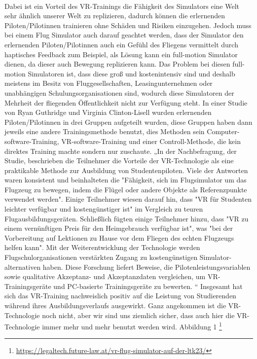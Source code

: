 \\
Dabei ist ein Vorteil des VR-Trainings die Fähigkeit des Simulators eine Welt sehr ähnlich unserer Welt zu replizieren, dadurch können die erlernenden Piloten/Pilotinnen trainieren ohne Schäden und Risiken einzugehen. Jedoch muss bei einem Flug Simulator auch darauf geachtet werden, dass der Simulator den erlernenden Piloten/Pilotinnen auch ein Gefühl des Fliegens vermittelt durch haptisches Feedback zum Beispiel, als Lösung kann ein full-motion Simulator dienen, da dieser auch Bewegung replizieren kann. Das Problem bei diesen full-motion Simulatoren ist, dass diese groß und kostenintensiv sind und deshalb meistens im Besitz von Fluggesellschaften, Leasingunternehmen oder unabhängigen Schulungsorganisationen sind, wodurch diese Simulatoren der Mehrheit der fliegenden Öffentlichkeit nicht zur Verfügung steht. In einer Studie von Ryan Guthridge und Virginia Clinton-Lisell wurden erlernenden Piloten/Pilotinnen in drei Gruppen aufgeteilt wurden, diese Gruppen haben dann jeweils eine andere Trainingsmethode benutzt, dies Methoden sein Computer-software-Training, VR-software-Training und einer Controll-Methode, die kein direktes Training machte sondern nur zuschaute. „In der Nachbefragung, der Studie, beschrieben die Teilnehmer die Vorteile der VR-Technologie als eine praktikable Methode zur Ausbildung von Studentenpiloten. Viele der Antworten waren konsistent und beinhalteten die "Fähigkeit, sich im Flugsimulator um das Flugzeug zu bewegen, indem die Flügel oder andere Objekte als Referenzpunkte verwendet werden". Einige Teilnehmer wiesen darauf hin, dass "VR für Studenten leichter verfügbar und kostengünstiger ist" im Vergleich zu teuren Flugausbildungsgeräten. Schließlich fügten einige Teilnehmer hinzu, dass "VR zu einem vernünftigen Preis für den Heimgebrauch verfügbar ist", was "bei der Vorbereitung auf Lektionen zu Hause vor dem Fliegen des echten Flugzeugs helfen kann". Mit der Weiterentwicklung der Technologie werden Flugschulorganisationen verstärkten Zugang zu kostengünstigen Simulator-alternativen haben. Diese Forschung liefert Beweise, die Pilotenleistungsvariablen sowie qualitative Akzeptanz- und Akzeptanzdaten vergleichen, um VR-Trainingsgeräte und PC-basierte Trainingsgeräte zu bewerten. \cite{guthridge2023evaluating}“ 
Insgesamt hat sich das VR-Training nachweislich positiv auf die Leistung von Studierenden während ihres Ausbildungsverlaufs ausgewirkt. Ganz angekommen ist die VR-Technologie noch nicht, aber wir sind uns ziemlich sicher, dass auch hier die VR-Technologie immer mehr und mehr benutzt werden wird.
Abbildung 1 \footnote{\url{https://legaltech.future-law.at/vr-flug-simulator-auf-der-ltk23/}}
